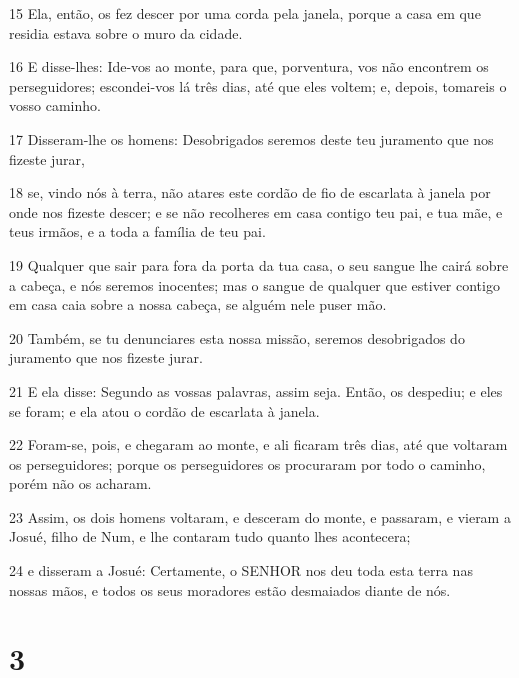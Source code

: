 \par 15 Ela, então, os fez descer por uma corda pela janela, porque a casa em que residia estava sobre o muro da cidade.
\par 16 E disse-lhes: Ide-vos ao monte, para que, porventura, vos não encontrem os perseguidores; escondei-vos lá três dias, até que eles voltem; e, depois, tomareis o vosso caminho.
\par 17 Disseram-lhe os homens: Desobrigados seremos deste teu juramento que nos fizeste jurar,
\par 18 se, vindo nós à terra, não atares este cordão de fio de escarlata à janela por onde nos fizeste descer; e se não recolheres em casa contigo teu pai, e tua mãe, e teus irmãos, e a toda a família de teu pai.
\par 19 Qualquer que sair para fora da porta da tua casa, o seu sangue lhe cairá sobre a cabeça, e nós seremos inocentes; mas o sangue de qualquer que estiver contigo em casa caia sobre a nossa cabeça, se alguém nele puser mão.
\par 20 Também, se tu denunciares esta nossa missão, seremos desobrigados do juramento que nos fizeste jurar.
\par 21 E ela disse: Segundo as vossas palavras, assim seja. Então, os despediu; e eles se foram; e ela atou o cordão de escarlata à janela.
\par 22 Foram-se, pois, e chegaram ao monte, e ali ficaram três dias, até que voltaram os perseguidores; porque os perseguidores os procuraram por todo o caminho, porém não os acharam.
\par 23 Assim, os dois homens voltaram, e desceram do monte, e passaram, e vieram a Josué, filho de Num, e lhe contaram tudo quanto lhes acontecera;
\par 24 e disseram a Josué: Certamente, o SENHOR nos deu toda esta terra nas nossas mãos, e todos os seus moradores estão desmaiados diante de nós.

\chapter{3}

